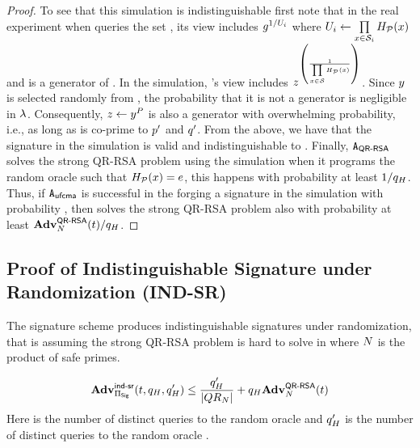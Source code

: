 \begin{proof}
	
\enumListEnd

To see that this simulation is indistinguishable first note that in the real 
experiment when \ufcmaAdversary queries the set 
\genericSetVar, its view includes $\qrGen^{1/\accSet_{\setIdx}}$ 
where $\accSet[\setIdx] \gets \prod\limits_{\genericSetElmt \in \genericSetVar[\setIdx]} 
\primeRO(\genericSetElmt)$ and \qrGen is a generator of \qrGroup. In the simulation, 
\ufcmaAdversary's view includes $\simFnOutput^{\left(\frac{1}{\challengeSetAcc}\right)}$. 
Since $\genericFnOutput$ is selected randomly from 
\qrGroup, the probability that it is not a generator is negligible in $\lambda$. Consequently, $\simFnOutput 
\gets \genericFnOutput^{\randPrimeAccSet}$ is also a generator with overwhelming 
probability, i.e., as long as \randPrimeAccSet is co-prime to $\sgPrime[1]$ and $\sgPrime[2]$. From 
the above, we have that the signature in the simulation is valid and 
indistinguishable to \ufcmaAdversary. Finally, $\rsaAdversary$ solves the strong QR-RSA problem 
using the simulation when it programs the random oracle such that $\primeRO(\genericSetElmt) = 
\rsaExponent$, this happens with probability at least 
$1/q_H$. Thus, if $\ufcmaAdversary$ is successful 
in the forging a signature in the simulation with probability \ufcmaAdv, then \rsaAdversary solves the 
strong QR-RSA problem also with probability at least $\mathbf{Adv}^{\textsf{QR-RSA}}_{N}(t)/q_H$. 
\end{proof}


\subsection{Proof of Indistinguishable Signature under Randomization (IND-SR)}
\label{app:proof_indsr}

\begin{theorem}
\label{thm:indsr}
	The signature scheme \sigScheme produces indistinguishable signatures under randomization, that is 
	assuming the strong QR-RSA problem is hard to solve in \qrGroup where $N$ is the product of safe primes.
	
	\[
	\Advantage{\indsrLabel}{\sigScheme}(\timeBound, 
	\oracleQueries, \oracleQueries') \le   \frac{\oracleQueries' }{\setSize{\qrGroup}}  + \oracleQueries 
	\rsaAdv
	\]
Here \oracleQueries is the number of distinct queries to the random oracle \primeRO and 
$q_H'$ is the number of distinct queries to the random oracle \ro.


\end{theorem}


